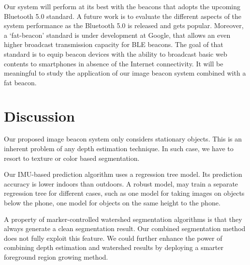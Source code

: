 Our system will perform at its best with the beacons that adopts the upcoming Bluetooth 5.0 standard. A future work is to evaluate the different aspects of the system performance as the Bluetooth 5.0 is released and gets popular. Moreover, a `fat-beacon' standard is under development at Google, that allows an even higher broadcast transmission capacity for BLE beacons. The goal of that standard is to equip beacon devices with the ability to broadcast basic web contents to smartphones in absence of the Internet connectivity. It will be meaningful to study the application of our image beacon system combined with a fat beacon.



\section{Discussion}
\label{sec:discussion}


Our proposed image beacon system only considers stationary objects. This is an inherent problem of any depth estimation technique. In such case, we have to resort to texture or color based segmentation.


Our IMU-based prediction algorithm uses a regression tree model. Its prediction accuracy is lower indoors than outdoors. A robust model, may train a separate regression tree for different cases, such as one model for taking images on objects below the phone, one model for objects on the same height to the phone.


A property of marker-controlled watershed segmentation algorithms is that they always generate a clean segmentation result. Our combined segmentation method does not fully exploit this feature. We could further enhance the power of combining depth estimation and watershed results by deploying a smarter foreground region growing method.

